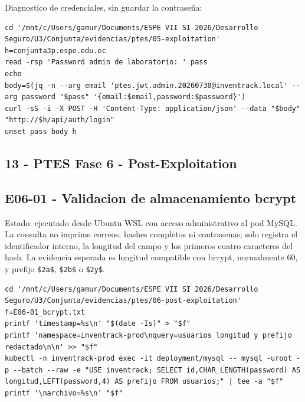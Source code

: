 Diagnostico de credenciales, sin guardar la contraseña:

\begin{tcolorbox}[codebox]
\begin{Verbatim}[fontsize=\scriptsize,breaklines=true,breakanywhere=true]
cd '/mnt/c/Users/gamur/Documents/ESPE VII SI 2026/Desarrollo Seguro/U3/Conjunta/evidencias/ptes/05-exploitation'
h=conjunta3p.espe.edu.ec
read -rsp 'Password admin de laboratorio: ' pass
echo
body=$(jq -n --arg email 'ptes.jwt.admin.20260730@inventrack.local' --arg password "$pass" '{email:$email,password:$password}')
curl -sS -i -X POST -H 'Content-Type: application/json' --data "$body" "http://$h/api/auth/login"
unset pass body h
\end{Verbatim}
\end{tcolorbox}

\subsection{13 - PTES Fase 6 - Post-Exploitation}\label{13---ptes-fase-6---post-exploitation}

\subsection{E06-01 - Validacion de almacenamiento bcrypt}\label{e06-01---validacion-de-almacenamiento-bcrypt}

Estado: ejecutado desde Ubuntu WSL con acceso administrativo al pod MySQL. La consulta no imprime correos, hashes completos ni contrasenas; solo registra el identificador interno, la longitud del campo y los primeros cuatro caracteres del hash. La evidencia esperada es longitud compatible con bcrypt, normalmente 60, y prefijo \texttt{\$2a\$}, \texttt{\$2b\$} o \texttt{\$2y\$}.

\begin{tcolorbox}[codebox]
\begin{Verbatim}[fontsize=\scriptsize,breaklines=true,breakanywhere=true]
cd '/mnt/c/Users/gamur/Documents/ESPE VII SI 2026/Desarrollo Seguro/U3/Conjunta/evidencias/ptes/06-post-exploitation'
f=E06-01_bcrypt.txt
printf 'timestamp=%s\n' "$(date -Is)" > "$f"
printf 'namespace=inventrack-prod\nquery=usuarios longitud y prefijo redactado\n\n' >> "$f"
kubectl -n inventrack-prod exec -it deployment/mysql -- mysql -uroot -p --batch --raw -e "USE inventrack; SELECT id,CHAR_LENGTH(password) AS longitud,LEFT(password,4) AS prefijo FROM usuarios;" | tee -a "$f"
printf '\narchivo=%s\n' "$f"
\end{Verbatim}
\end{tcolorbox}

